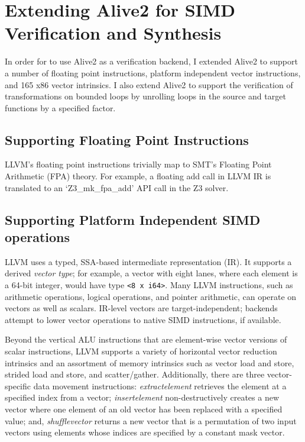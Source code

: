\chapter{Extending Alive2 for SIMD Verification and Synthesis}
\label{chap:translation-validation}

In order for \minotaur{} to use Alive2 as a verification backend, I extended
Alive2 to support a number of floating point instructions,
platform independent vector instructions, and 165 x86 vector intrinsics.
%
I also extend Alive2 to support the verification of transformations on
bounded loops by unrolling loops in the source and target functions by
a specified factor.

\section{Supporting Floating Point Instructions}

LLVM's floating point instructions trivially map to SMT's Floating Point
Arithmetic (FPA) theory.
%
For example, a floating add call in LLVM IR is translated to an `Z3_mk_fpa_add'
API call in the Z3 solver.
%













\section{Supporting Platform Independent SIMD operations}

LLVM uses a typed, SSA-based intermediate representation (IR).
%
It supports a derived \emph{vector type}; for example, a vector with
eight lanes, where each element is a 64-bit integer, would have type
\texttt{<8 x i64>}.
%
Many LLVM instructions, such as arithmetic operations, logical operations,
and pointer arithmetic, can operate on vectors as well as scalars.
%
IR-level vectors are target-independent; backends attempt to lower
vector operations to native SIMD instructions, if available.


Beyond the vertical ALU instructions that are element-wise vector
versions of scalar instructions, LLVM supports a variety of horizontal
vector reduction intrinsics and an assortment of memory intrinsics
such as vector load and store, strided load and store, and
scatter/gather.
%
Additionally, there are three vector-specific data movement
instructions:
%
\textit{extractelement} retrieves the element at a specified index from
a vector;
%
\textit{insertelement} non-destructively creates a new vector where
one element of an old vector has been replaced with a specified value;
%
and, \textit{shufflevector} returns a new vector that is a permutation
of two input vectors using elements whose indices are specified by a
constant mask vector.



